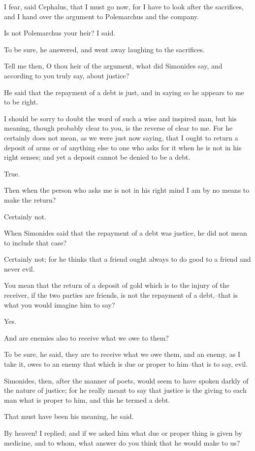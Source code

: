 I fear, said Cephalus, that I must go now, for I have to look after the
sacrifices, and I hand over the argument to Polemarchus and the company.

Is not Polemarchus your heir? I said.

To be sure, he answered, and went away laughing to the sacrifices.

Tell me then, O thou heir of the argument, what did Simonides say, and
according to you truly say, about justice?

He said that the repayment of a debt is just, and in saying so he
appears to me to be right.

I should be sorry to doubt the word of such a wise and inspired man, but
his meaning, though probably clear to you, is the reverse of clear to
me. For he certainly does not mean, as we were just now saying, that I
ought to return a deposit of arms or of anything else to one who asks
for it when he is not in his right senses; and yet a deposit cannot be
denied to be a debt.

True.

Then when the person who asks me is not in his right mind I am by no
means to make the return?

Certainly not.

When Simonides said that the repayment of a debt was justice, he did not
mean to include that case?

Certainly not; for he thinks that a friend ought always to do good to a
friend and never evil.

You mean that the return of a deposit of gold which is to the injury of
the receiver, if the two parties are friends, is not the repayment of a
debt,--that is what you would imagine him to say?

Yes.

And are enemies also to receive what we owe to them?

To be sure, he said, they are to receive what we owe them, and an enemy,
as I take it, owes to an enemy that which is due or proper to him--that
is to say, evil.

Simonides, then, after the manner of poets, would seem to have spoken
darkly of the nature of justice; for he really meant to say that justice
is the giving to each man what is proper to him, and this he termed a
debt.

That must have been his meaning, he said.

By heaven! I replied; and if we asked him what due or proper thing is
given by medicine, and to whom, what answer do you think that he would
make to us?

